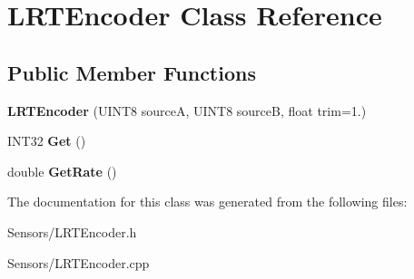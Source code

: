 \hypertarget{class_l_r_t_encoder}{
\section{\-L\-R\-T\-Encoder \-Class \-Reference}
\label{class_l_r_t_encoder}
}
\subsection*{\-Public \-Member \-Functions}
\begin{DoxyCompactItemize}
\item 
\hypertarget{class_l_r_t_encoder_a92f92fc75ed1861c7c7392e0672f02a6}{
{\bfseries \-L\-R\-T\-Encoder} (\-U\-I\-N\-T8 source\-A, \-U\-I\-N\-T8 source\-B, float trim=1.)}
\label{class_l_r_t_encoder_a92f92fc75ed1861c7c7392e0672f02a6}

\item 
\hypertarget{class_l_r_t_encoder_aead176aa502d85655e79e791c930147b}{
\-I\-N\-T32 {\bfseries \-Get} ()}
\label{class_l_r_t_encoder_aead176aa502d85655e79e791c930147b}

\item 
\hypertarget{class_l_r_t_encoder_a6a305ce46c54400ee601d06b7570d3b2}{
double {\bfseries \-Get\-Rate} ()}
\label{class_l_r_t_encoder_a6a305ce46c54400ee601d06b7570d3b2}

\end{DoxyCompactItemize}


\-The documentation for this class was generated from the following files\-:\begin{DoxyCompactItemize}
\item 
\-Sensors/\-L\-R\-T\-Encoder.\-h\item 
\-Sensors/\-L\-R\-T\-Encoder.\-cpp\end{DoxyCompactItemize}
